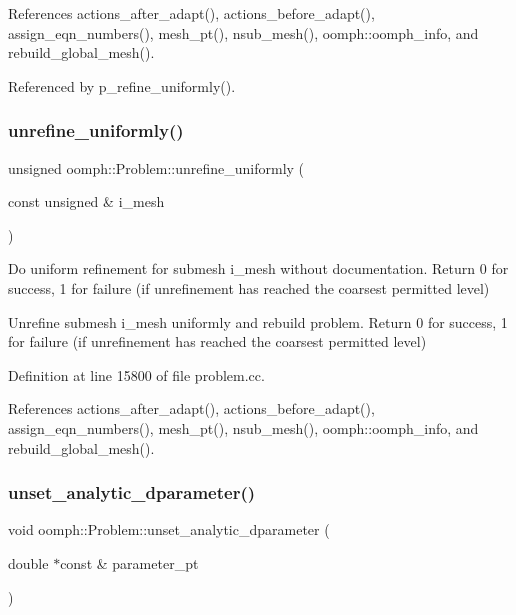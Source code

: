 References actions\+\_\+after\+\_\+adapt(), actions\+\_\+before\+\_\+adapt(), assign\+\_\+eqn\+\_\+numbers(), mesh\+\_\+pt(), nsub\+\_\+mesh(), oomph\+::oomph\+\_\+info, and rebuild\+\_\+global\+\_\+mesh().



Referenced by p\+\_\+refine\+\_\+uniformly().

\mbox{\label{classoomph_1_1Problem_aadd2996d4046e5a6176c92f4abc899d5}} 
\subsubsection{\texorpdfstring{unrefine\+\_\+uniformly()}{unrefine\_uniformly()}\hspace{0.1cm}{\footnotesize\ttfamily [2/2]}}
{\footnotesize\ttfamily unsigned oomph\+::\+Problem\+::unrefine\+\_\+uniformly (\begin{DoxyParamCaption}\item[{const unsigned \&}]{i\+\_\+mesh }\end{DoxyParamCaption})}

Do uniform refinement for submesh i\+\_\+mesh without documentation. Return 0 for success, 1 for failure (if unrefinement has reached the coarsest permitted level)

Unrefine submesh i\+\_\+mesh uniformly and rebuild problem. Return 0 for success, 1 for failure (if unrefinement has reached the coarsest permitted level) 

Definition at line 15800 of file problem.\+cc.



References actions\+\_\+after\+\_\+adapt(), actions\+\_\+before\+\_\+adapt(), assign\+\_\+eqn\+\_\+numbers(), mesh\+\_\+pt(), nsub\+\_\+mesh(), oomph\+::oomph\+\_\+info, and rebuild\+\_\+global\+\_\+mesh().

\mbox{\label{classoomph_1_1Problem_aff7bcab5505ba482a8c9ba7bace68bc0}} 
\subsubsection{\texorpdfstring{unset\+\_\+analytic\+\_\+dparameter()}{unset\_analytic\_dparameter()}}
{\footnotesize\ttfamily void oomph\+::\+Problem\+::unset\+\_\+analytic\+\_\+dparameter (\begin{DoxyParamCaption}\item[{double $\ast$const \&}]{parameter\+\_\+pt }\end{DoxyParamCaption})\hspace{0.3cm}{\ttfamily [inline]}}




